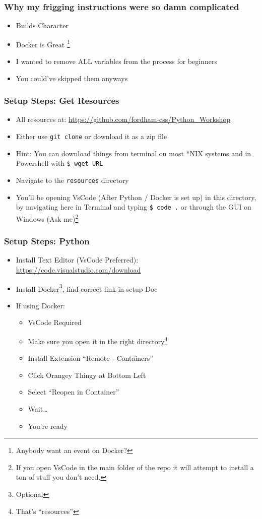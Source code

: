 \documentclass[aspectratio=169]{beamer}
\begin{document}
\begin{frame}
  \frametitle{Why my frigging instructions were so damn complicated}
  \begin{itemize}
    \item Builds Character
    \pause
    \item Docker is Great
    \footnote{Anybody want an event on Docker?}
    \pause
    \item I wanted to remove ALL variables from the process for beginners
    \pause
    \item You could've skipped them anyways
  \end{itemize}
\end{frame}
\begin{frame}
  \frametitle{Setup Steps: Get Resources}
  \begin{itemize}
    \item All resources at: \url{https://github.com/fordham-css/Python_Workshop}
    \item Either use \texttt{git clone} or download it as a zip file
    \item Hint: You can download things from terminal on
          most *NIX systems and in Powershell with \texttt{\$ wget URL}
    \item Navigate to the \texttt{resources} directory
    \item You'll be opening VsCode (After Python / Docker is set up) in this directory,
          by navigating here in Terminal and typing \texttt{\$ code .} or through
          the GUI on Windows (Ask me)\footnote{If you open VsCode in the main folder
          of the repo it will attempt to install a ton of stuff you don't need.}
  \end{itemize}

\end{frame}
\begin{frame}
  \frametitle{Setup Steps: Python}
  \begin{itemize}
    \item Install Text Editor (VsCode Preferred): \url{https://code.visualstudio.com/download}
    \item Install Docker\footnote{Optional}, find correct link in setup Doc
    \pause
    \item If using Docker:
      \begin{itemize}
        \item VsCode Required
        \item Make sure you open it in the right directory\footnote{That's ``resources''}
        \item Install Extension ``Remote - Containers''
        \item Click Orangey Thingy at Bottom Left
        \item Select ``Reopen in Container''
        \item Wait\dots
        \item You're ready
      \end{itemize}
  \end{itemize}
\end{frame}
\end{document}
